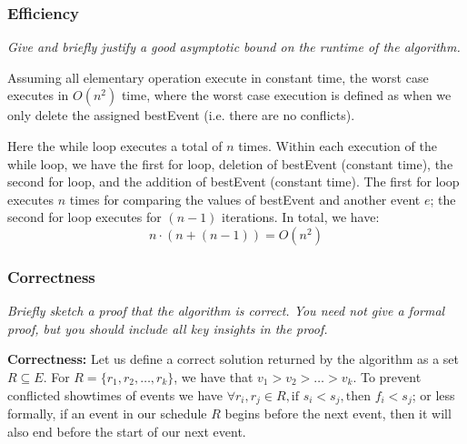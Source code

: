\documentclass[11pt, oneside]{article}   	%
\theoremstyle{definition}
\theoremstyle{remark}
\begin{document}
\subsubsection{Efficiency}
\textit{Give and briefly justify a good asymptotic bound on the runtime of the algorithm.}

Assuming all elementary operation execute in constant time, the worst case executes in $O(n^2)$ time, where the worst case execution is defined as when we only delete the assigned bestEvent (i.e. there are no conflicts). 

Here the while loop executes a total of $n$ times. Within each execution of the while loop, we have the first for loop, deletion of bestEvent (constant time), the second for loop, and the addition of bestEvent (constant time). The first for loop executes $n$ times for comparing the values of bestEvent and another event $e$; the second for loop executes for $(n-1)$ iterations. In total, we have: $$n \cdot (n + (n-1)) = O(n^2)$$

\subsubsection{Correctness}
\textit{Briefly sketch a proof that the algorithm is correct. You need not give a formal proof, but you should include all key insights in the
proof.}

\textbf{Correctness:} Let us define a correct solution returned by the algorithm as a set $R \subseteq E$. For $R=\{r_1, r_2, \ldots, r_k\}$, we have that $v_1 > v_2 > \ldots > v_k$. To prevent conflicted showtimes of events we have $ \forall r_i, r_j \in R, \text{if } s_i < s_j, \text{then } f_i < s_j$; or less formally, if an event in our schedule $R$ begins before the next event, then it will also end before the start of our next event.
\end{document}
